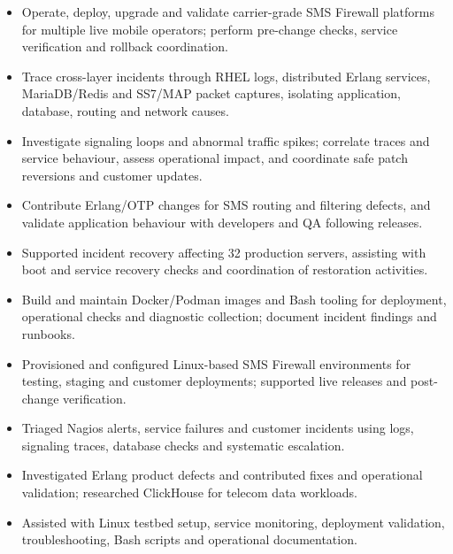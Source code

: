 \begin{itemize}
\item Operate, deploy, upgrade and validate carrier-grade SMS Firewall platforms for multiple live mobile operators; perform pre-change checks, service verification and rollback coordination.
\item Trace cross-layer incidents through RHEL logs, distributed Erlang services, MariaDB/Redis and SS7/MAP packet captures, isolating application, database, routing and network causes.
\item Investigate signaling loops and abnormal traffic spikes; correlate traces and service behaviour, assess operational impact, and coordinate safe patch reversions and customer updates.
\item Contribute Erlang/OTP changes for SMS routing and filtering defects, and validate application behaviour with developers and QA following releases.
\item Supported incident recovery affecting 32 production servers, assisting with boot and service recovery checks and coordination of restoration activities.
\item Build and maintain Docker/Podman images and Bash tooling for deployment, operational checks and diagnostic collection; document incident findings and runbooks.
\end{itemize}

\begin{itemize}
\item Provisioned and configured Linux-based SMS Firewall environments for testing, staging and customer deployments; supported live releases and post-change verification.
\item Triaged Nagios alerts, service failures and customer incidents using logs, signaling traces, database checks and systematic escalation.
\item Investigated Erlang product defects and contributed fixes and operational validation; researched ClickHouse for telecom data workloads.
\end{itemize}

\begin{itemize}
\item Assisted with Linux testbed setup, service monitoring, deployment validation, troubleshooting, Bash scripts and operational documentation.
\end{itemize}

